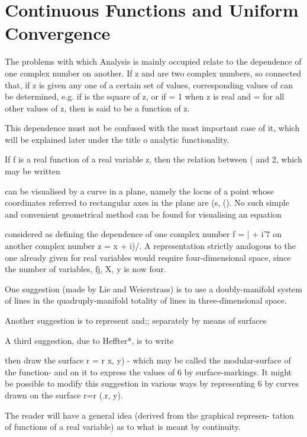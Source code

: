 %
%
\chapter{Continuous Functions and Uniform Convergence}


The problems with which Analysis is mainly occupied relate to the
dependence of one complex number on another. If z and are two complex
numbers, so connected that, if z is given any one of a certain set of
values, corresponding values of can be determined, e.g. if is the
square of z, or if = 1 when z is real and = for all other values of z,
then is said to be a function of z.

This dependence must not be confused with the most important case of
it, which will be explained later under the title o analytic
functionality.

If f is a real function of a real variable z, then the relation
between ( and 2, which may be written

can be visualised by a curve in a plane, namely the locus of a point
whose coordinates referred to rectangular axes in the plane are (s,
(). No such simple and convenient geometrical method can be found for
visualising an equation

considered as defining the dependence of one complex number f = | +
i'7 on another complex number z = x + i)/. A representation strictly
analogous to the one already given for real variables would require
four-dimensional space, since the number of variables, fj, X, y is
now four.

One suggestion (made by Lie and Weierstrass) is to use a
doubly-manifold system of lines in the quadruply-manifold totality of
lines in three-dimensional space.

Another suggestion is to represent and;; separately by means of
surfaces

A third suggestion, due to Heffter*, is to write

then draw the surface r = r x, y) - which may be called the
modular-surface of the function- and on it to express the values of 6
by surface-markings. It might be possible to modify this suggestion in
various ways by representing 6 by curves drawn on the surface r=r (.r,
y).


The reader will have a general idea (derived from the graphical
represen- tation of functions of a real variable) as to what is meant
by continuity.

